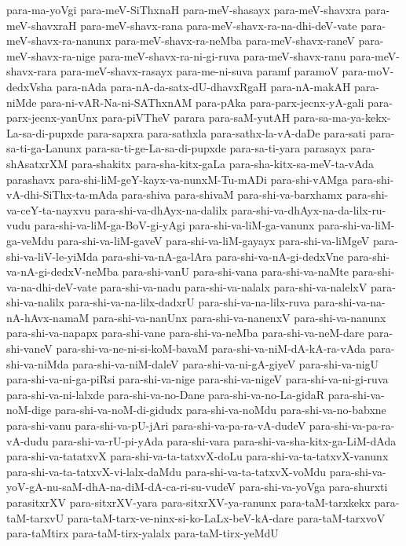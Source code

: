 {para-ma-yoVgi
para-meV-SiThxnaH
para-meV-shasayx
para-meV-shavxra
para-meV-shavxraH
para-meV-shavx-rana
para-meV-shavx-ra-na-dhi-deV-vate
para-meV-shavx-ra-nanunx
para-meV-shavx-ra-neMba
para-meV-shavx-raneV
para-meV-shavx-ra-nige
para-meV-shavx-ra-ni-gi-ruva
para-meV-shavx-ranu
para-meV-shavx-rara
para-meV-shavx-rasayx
para-me-ni-suva
paramf
paramoV
para-moV-dedxVsha
para-nAda
para-nA-da-satx-dU-dhavxRgaH
para-nA-makAH
para-niMde
para-ni-vAR-Na-ni-SAThxnAM
para-pAka
para-parx-jecnx-yA-gali
para-parx-jecnx-yanUnx
para-piVTheV
parara
para-saM-yutAH
para-sa-ma-ya-kekx-La-sa-di-pupxde
para-sapxra
para-sathxla
para-sathx-la-vA-daDe
para-sati
para-sa-ti-ga-Lanunx
para-sa-ti-ge-La-sa-di-pupxde
para-sa-ti-yara
parasayx
para-shAsatxrXM
para-shakitx
para-sha-kitx-gaLa
para-sha-kitx-sa-meV-ta-vAda
parashavx
para-shi-liM-geY-kayx-va-nunxM-Tu-mADi
para-shi-vAMga
para-shi-vA-dhi-SiThx-ta-mAda
para-shiva
para-shivaM
para-shi-va-barxhamx
para-shi-va-ceY-ta-nayxvu
para-shi-va-dhAyx-na-dalilx
para-shi-va-dhAyx-na-da-lilx-ru-vudu
para-shi-va-liM-ga-BoV-gi-yAgi
para-shi-va-liM-ga-vanunx
para-shi-va-liM-ga-veMdu
para-shi-va-liM-gaveV
para-shi-va-liM-gayayx
para-shi-va-liMgeV
para-shi-va-liV-le-yiMda
para-shi-va-nA-ga-lAra
para-shi-va-nA-gi-dedxVne
para-shi-va-nA-gi-dedxV-neMba
para-shi-vanU
para-shi-vana
para-shi-va-naMte
para-shi-va-na-dhi-deV-vate
para-shi-va-nadu
para-shi-va-nalalx
para-shi-va-nalelxV
para-shi-va-nalilx
para-shi-va-na-lilx-dadxrU
para-shi-va-na-lilx-ruva
para-shi-va-na-nA-hAvx-namaM
para-shi-va-nanUnx
para-shi-va-nanenxV
para-shi-va-nanunx
para-shi-va-napapx
para-shi-vane
para-shi-va-neMba
para-shi-va-neM-dare
para-shi-vaneV
para-shi-va-ne-ni-si-koM-bavaM
para-shi-va-niM-dA-kA-ra-vAda
para-shi-va-niMda
para-shi-va-niM-daleV
para-shi-va-ni-gA-giyeV
para-shi-va-nigU
para-shi-va-ni-ga-piRsi
para-shi-va-nige
para-shi-va-nigeV
para-shi-va-ni-gi-ruva
para-shi-va-ni-lalxde
para-shi-va-no-Dane
para-shi-va-no-La-gidaR
para-shi-va-noM-dige
para-shi-va-noM-di-gidudx
para-shi-va-noMdu
para-shi-va-no-babxne
para-shi-vanu
para-shi-va-pU-jAri
para-shi-va-pa-ra-vA-dudeV
para-shi-va-pa-ra-vA-dudu
para-shi-va-rU-pi-yAda
para-shi-vara
para-shi-va-sha-kitx-ga-LiM-dAda
para-shi-va-tatatxvX
para-shi-va-ta-tatxvX-doLu
para-shi-va-ta-tatxvX-vanunx
para-shi-va-ta-tatxvX-vi-lalx-daMdu
para-shi-va-ta-tatxvX-voMdu
para-shi-va-yoV-gA-nu-saM-dhA-na-diM-dA-ca-ri-su-vudeV
para-shi-va-yoVga
para-shurxti
parasitxrXV
para-sitxrXV-yara
para-sitxrXV-ya-ranunx
para-taM-tarxkekx
para-taM-tarxvU
para-taM-tarx-ve-ninx-si-ko-LaLx-beV-kA-dare
para-taM-tarxvoV
para-taMtirx
para-taM-tirx-yalalx
para-taM-tirx-yeMdU
}
